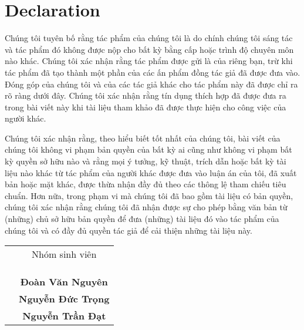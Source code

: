\chapter*{Declaration}
Chúng tôi tuyên bố rằng tác phẩm của chúng tôi là do chính chúng tôi sáng tác và tác phẩm đó không được nộp cho bất kỳ bằng cấp hoặc trình độ chuyên môn nào khác.
Chúng tôi xác nhận rằng tác phẩm được gửi là của riêng bạn, trừ khi tác phẩm đã tạo thành một phần của các ấn phẩm đồng tác giả đã được đưa vào. Đóng góp của chúng tôi và của các tác giả khác cho tác phẩm này đã được chỉ ra rõ ràng dưới đây.
Chúng tôi xác nhận rằng tín dụng thích hợp đã được đưa ra trong bài viết này khi tài liệu tham khảo đã được thực hiện cho công việc của người khác.


Chúng tôi xác nhận rằng, theo hiểu biết tốt nhất của chúng tôi, bài viết của chúng tôi không vi phạm bản quyền của bất kỳ ai cũng như không vi phạm bất kỳ quyền sở hữu nào và rằng mọi ý tưởng, kỹ thuật, trích dẫn hoặc bất kỳ tài liệu nào khác từ tác phẩm của người khác được đưa vào luận án của tôi, đã xuất bản hoặc mặt khác, được thừa nhận đầy đủ theo các thông lệ tham chiếu tiêu chuẩn.
Hơn nữa, trong phạm vi mà chúng tôi đã bao gồm tài liệu có bản quyền, chúng tôi xác nhận rằng chúng tôi đã nhận được sự cho phép bằng văn bản từ (những) chủ sở hữu bản quyền để đưa (những) tài liệu đó vào tác phẩm của chúng tôi và có đầy đủ quyền tác giả để cải thiện những tài liệu này.

\begin{table}[h]
\begin{tabular}{p{}c}
 & Nhóm sinh viên \\
 &              \\
 &              \\
 &              \\
 & \textbf{Đoàn Văn Nguyên}\\
 & \textbf{Nguyễn Đức Trọng}\\
 & \textbf{Nguyễn Trần Đạt}
\end{tabular}
\end{table}